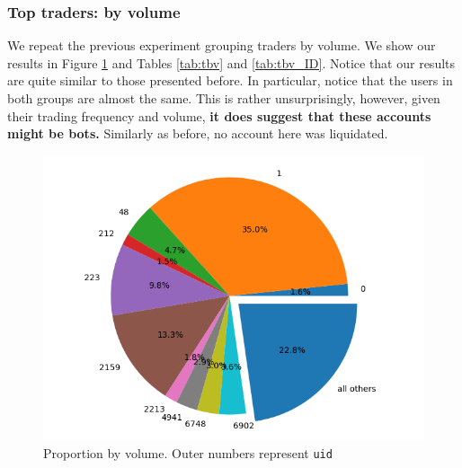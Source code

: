 \documentclass[]{scrartcl}
\begin{document}
	\subsubsection*{Top traders: by volume} 
	We repeat the previous experiment grouping traders by volume. We show our results in Figure \ref{fig:tradesbyvol} and Tables \ref{tab:tbv} and \ref{tab:tbv_ID}. Notice that our results are quite similar to those presented before. In particular, notice that the users in both groups are almost the same. This is rather unsurprisingly, however, given their trading frequency and volume, \textbf{it does suggest that these accounts might be bots.} Similarly as before,  no account here was liquidated.
	\begin{figure}
		\centering
		\includegraphics[width=0.7\linewidth]{figures/trades_by_vol}
		\caption{Proportion by volume. Outer numbers represent \texttt{uid}}
		\label{fig:tradesbyvol}
	\end{figure}
	
\end{document}

